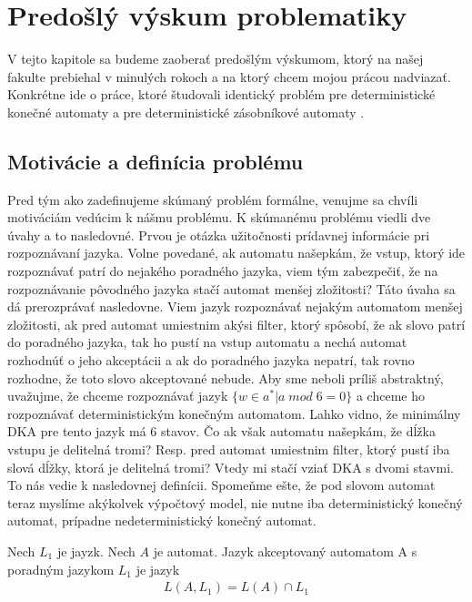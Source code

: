 \chapter{Predošlý výskum problematiky}
\label{kap:old} %

V tejto kapitole sa budeme zaoberať predošlým výskumom, ktorý na našej fakulte prebiehal v minulých rokoch a na ktorý chcem mojou prácou nadviazať. Konkrétne ide o práce, ktoré študovali identický problém pre deterministické konečné automaty \cite{Gazi} a pre deterministické zásobníkové automaty \cite{Labath}.

\section{Motivácie a definícia problému}
Pred tým ako zadefinujeme skúmaný problém formálne, venujme sa chvíli motiváciám vedúcim k nášmu problému. K skúmanému problému viedli dve úvahy a to nasledovné. Prvou je otázka užitočnosti prídavnej informácie pri rozpoznávaní jazyka. Volne povedané, ak automatu našepkám, že vstup, ktorý ide rozpoznávať patrí do nejakého poradného jazyka, viem tým zabezpečiť, že na rozpoznávanie pôvodného jazyka stačí automat menšej zložitosti? Táto úvaha sa dá prerozprávať nasledovne. Viem jazyk rozpoznávať nejakým automatom menšej zložitosti, ak pred automat umiestnim akýsi filter, ktorý spôsobí, že ak slovo patrí do poradného jazyka, tak ho pustí na vstup automatu a nechá automat rozhodnúť o jeho akceptácii a ak do poradného jazyka nepatrí, tak rovno rozhodne, že toto slovo akceptované nebude. Aby sme neboli príliš abstraktný, uvažujme, že chceme rozpoznávať jazyk $ \lbrace w \in {a}^* | a \; mod \; 6 = 0 \rbrace $ a chceme ho rozpoznávať deterministickým konečným automatom. Lahko vidno, že minimálny DKA pre tento jazyk má 6 stavov. Čo ak však automatu našepkám, že dĺžka vstupu je delitelná tromi? Resp. pred automat umiestnim filter, ktorý pustí iba slová dĺžky, ktorá je delitelná tromi? Vtedy mi stačí vziať DKA s dvomi stavmi. To nás vedie k nasledovnej definícii. Spomeňme ešte, že pod slovom automat teraz myslíme akýkolvek výpočtový model, nie nutne iba deterministický konečný automat, prípadne nedeterministický konečný automat.

\begin{definition}
Nech $ L_1 $ je jayzk. Nech $ A $ je automat. Jazyk akceptovaný automatom A s poradným jazykom $ L_1 $ je jazyk
\begin{align*}
L(A, L_1) = L(A) \cap L_1
\end{align*}
\end{definition}


